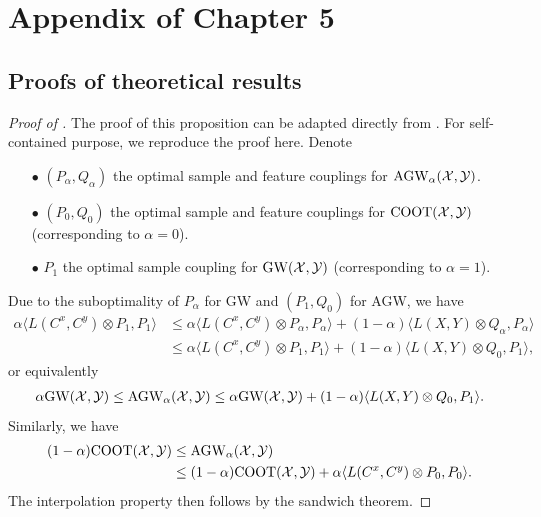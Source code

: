 \section{Appendix of Chapter 5}

\subsection{Proofs of theoretical results}

\begin{proof}[Proof of ]
  The proof of this proposition can be adapted directly from \citep{Vayer19b}.
  For self-contained purpose, we reproduce the proof here. Denote
  \begin{itemize}
      \item[$\bullet$] $(P_{\alpha}, Q_{\alpha})$ the optimal sample and feature couplings for
      $\text{AGW}_{\alpha}(\mathcal X, \mathcal Y)$.

      \item[$\bullet$] $(P_0, Q_0)$ the optimal sample and feature couplings for
      $\text{COOT}(\mathcal X, \mathcal Y)$ (corresponding to $\alpha = 0$).

      \item[$\bullet$] $P_1$ the optimal sample coupling for $\text{GW}(\mathcal X, \mathcal Y)$
      (corresponding to $\alpha = 1$).
  \end{itemize}
  Due to the suboptimality of $P_{\alpha}$ for GW and $(P_1, Q_0)$ for AGW, we have
  \begin{align}
      \alpha \langle L(C^x, C^y) \otimes P_1, P_1 \rangle
      &\leq \alpha \langle L(C^x, C^y) \otimes P_{\alpha}, P_{\alpha} \rangle
      + (1 - \alpha) \langle L(X, Y) \otimes Q_{\alpha}, P_{\alpha} \rangle \\
      &\leq \alpha \langle L(C^x, C^y) \otimes P_1, P_1 \rangle
      + (1 - \alpha) \langle L(X, Y) \otimes Q_0, P_1 \rangle,
  \end{align}
  or equivalently
  \begin{align}
      \alpha \text{GW}(\mathcal X, \mathcal Y) \leq \text{AGW}_{\alpha}(\mathcal X, \mathcal Y) \leq \alpha \text{GW}(\mathcal X, \mathcal Y)
      + (1 - \alpha) \langle L(X, Y) \otimes Q_0, P_1 \rangle.
  \end{align}
  Similarly, we have
  \begin{align}
      (1 - \alpha) \text{COOT}(\mathcal X, \mathcal Y) &\leq \text{AGW}_{\alpha}(\mathcal X, \mathcal Y) \\
      &\leq (1 - \alpha) \text{COOT}(\mathcal X, \mathcal Y) + \alpha \langle L(C^x, C^y) \otimes P_0, P_0 \rangle.
  \end{align}
  The interpolation property then follows by the sandwich theorem.


\end{proof}
